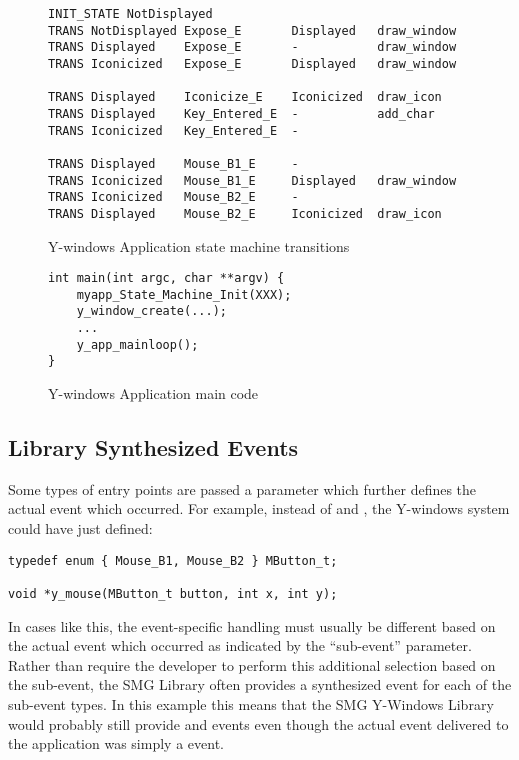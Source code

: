 \begin{figure*}
\begin{verbatim}
INIT_STATE NotDisplayed
TRANS NotDisplayed Expose_E       Displayed   draw_window
TRANS Displayed    Expose_E       -           draw_window
TRANS Iconicized   Expose_E       Displayed   draw_window

TRANS Displayed    Iconicize_E    Iconicized  draw_icon
TRANS Displayed    Key_Entered_E  -           add_char
TRANS Iconicized   Key_Entered_E  -

TRANS Displayed    Mouse_B1_E     -
TRANS Iconicized   Mouse_B1_E     Displayed   draw_window
TRANS Iconicized   Mouse_B2_E     -
TRANS Displayed    Mouse_B2_E     Iconicized  draw_icon
\end{verbatim}
\caption{Y-windows Application state machine transitions}\label{figure:y-app-trans}
\end{figure*}

\begin{figure*}
\begin{verbatim}
int main(int argc, char **argv) {
    myapp_State_Machine_Init(XXX);
    y_window_create(...);
    ...
    y_app_mainloop();
}
\end{verbatim}
\caption{Y-windows Application main code}\label{figure:y-app-main}
\end{figure*}


\subsection{Library Synthesized Events}

Some types of entry points are passed a parameter which further
defines the actual event which occurred.  For example, instead of
 and , the Y-windows system could have
just defined:

\begin{verbatim}
typedef enum { Mouse_B1, Mouse_B2 } MButton_t;

void *y_mouse(MButton_t button, int x, int y);
\end{verbatim}

In cases like this, the event-specific handling must usually be different
based on the actual event which occurred as indicated by the ``sub-event''
parameter.  Rather than require the developer to perform this additional
selection based on the sub-event, the SMG Library often provides a
synthesized event for each of the sub-event types.  In this example
this means that the SMG Y-Windows Library would probably still provide
 and  events even though the actual
event delivered to the application was simply a  event.

